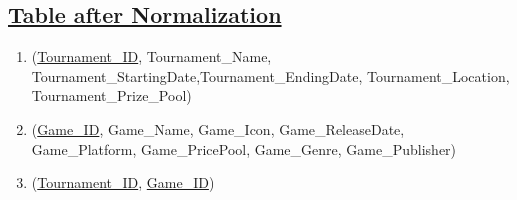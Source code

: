 \subsection*{\underline{Table after Normalization}}
\begin{enumerate}
    \item (\underline{Tournament\_ID}, Tournament\_Name, Tournament\_StartingDate,Tournament\_EndingDate, Tournament\_Location, Tournament\_Prize\_Pool)
    \item (\underline{Game\_ID}, Game\_Name, Game\_Icon, Game\_ReleaseDate, Game\_Platform, Game\_PricePool, Game\_Genre, Game\_Publisher)
    \item (\underline{Tournament\_ID}, \underline{Game\_ID})
\end{enumerate}


\clearpage